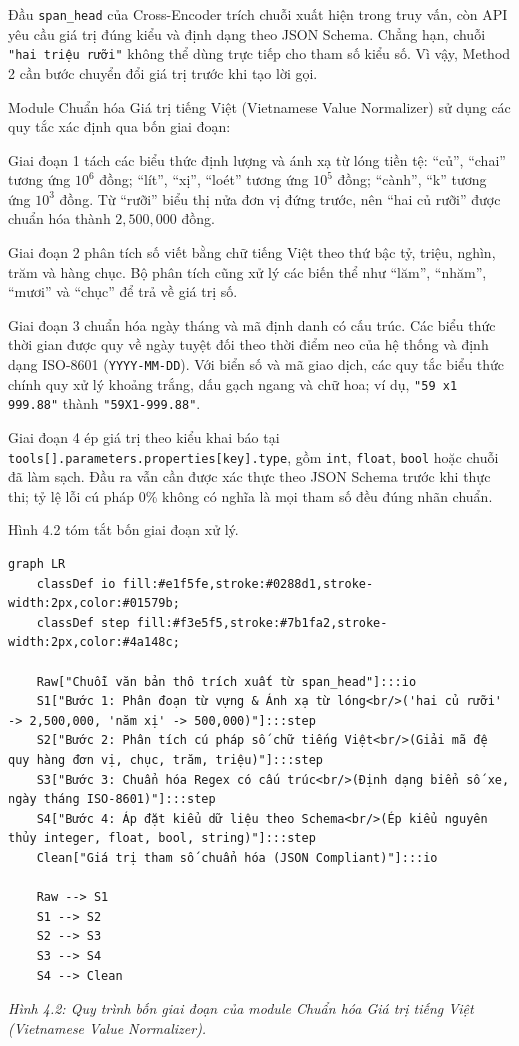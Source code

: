 Đầu \texttt{span_head} của Cross-Encoder trích chuỗi xuất hiện trong truy vấn, còn API yêu cầu giá trị đúng kiểu và định dạng theo JSON Schema. Chẳng hạn, chuỗi \texttt{"hai triệu rưỡi"} không thể dùng trực tiếp cho tham số kiểu số. Vì vậy, Method 2 cần bước chuyển đổi giá trị trước khi tạo lời gọi.

Module Chuẩn hóa Giá trị tiếng Việt (Vietnamese Value Normalizer) sử dụng các quy tắc xác định qua bốn giai đoạn:

Giai đoạn 1 tách các biểu thức định lượng và ánh xạ từ lóng tiền tệ: “củ”, “chai” tương ứng $10^6$ đồng; “lít”, “xị”, “loét” tương ứng $10^5$ đồng; “cành”, “k” tương ứng $10^3$ đồng. Từ “rưỡi” biểu thị nửa đơn vị đứng trước, nên “hai củ rưỡi” được chuẩn hóa thành $2{,}500{,}000$ đồng.

Giai đoạn 2 phân tích số viết bằng chữ tiếng Việt theo thứ bậc tỷ, triệu, nghìn, trăm và hàng chục. Bộ phân tích cũng xử lý các biến thể như “lăm”, “nhăm”, “mươi” và “chục” để trả về giá trị số.

Giai đoạn 3 chuẩn hóa ngày tháng và mã định danh có cấu trúc. Các biểu thức thời gian được quy về ngày tuyệt đối theo thời điểm neo của hệ thống và định dạng ISO-8601 (\texttt{YYYY-MM-DD}). Với biển số và mã giao dịch, các quy tắc biểu thức chính quy xử lý khoảng trắng, dấu gạch ngang và chữ hoa; ví dụ, \texttt{"59 x1 999.88"} thành \texttt{"59X1-999.88"}.

Giai đoạn 4 ép giá trị theo kiểu khai báo tại \texttt{tools[].parameters.properties[key].type}, gồm \texttt{int}, \texttt{float}, \texttt{bool} hoặc chuỗi đã làm sạch. Đầu ra vẫn cần được xác thực theo JSON Schema trước khi thực thi; tỷ lệ lỗi cú pháp 0\% không có nghĩa là mọi tham số đều đúng nhãn chuẩn.

Hình 4.2 tóm tắt bốn giai đoạn xử lý.

\begin{verbatim}
graph LR
    classDef io fill:#e1f5fe,stroke:#0288d1,stroke-width:2px,color:#01579b;
    classDef step fill:#f3e5f5,stroke:#7b1fa2,stroke-width:2px,color:#4a148c;

    Raw["Chuỗi văn bản thô trích xuất từ span_head"]:::io
    S1["Bước 1: Phân đoạn từ vựng & Ánh xạ từ lóng<br/>('hai củ rưỡi' -> 2,500,000, 'năm xị' -> 500,000)"]:::step
    S2["Bước 2: Phân tích cú pháp số chữ tiếng Việt<br/>(Giải mã đệ quy hàng đơn vị, chục, trăm, triệu)"]:::step
    S3["Bước 3: Chuẩn hóa Regex có cấu trúc<br/>(Định dạng biển số xe, ngày tháng ISO-8601)"]:::step
    S4["Bước 4: Áp đặt kiểu dữ liệu theo Schema<br/>(Ép kiểu nguyên thủy integer, float, bool, string)"]:::step
    Clean["Giá trị tham số chuẩn hóa (JSON Compliant)"]:::io

    Raw --> S1
    S1 --> S2
    S2 --> S3
    S3 --> S4
    S4 --> Clean
\end{verbatim}

\textit{Hình 4.2: Quy trình bốn giai đoạn của module Chuẩn hóa Giá trị tiếng Việt (Vietnamese Value Normalizer).}

